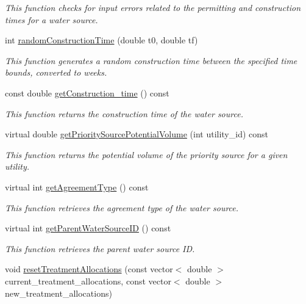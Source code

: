 \begin{DoxyCompactItemize}
\begin{DoxyCompactList}\small\item\em This function checks for input errors related to the permitting and construction times for a water source. \end{DoxyCompactList}\item 
int \mbox{\hyperlink{classWaterSource_aebc6985952d3e69f0d8ae1d0498a1ffe}{random\+Construction\+Time}} (double t0, double tf)
\begin{DoxyCompactList}\small\item\em This function generates a random construction time between the specified time bounds, converted to weeks. \end{DoxyCompactList}\item 
const double \mbox{\hyperlink{classWaterSource_ac1e8880f0aeb56b2728e253d3500ef40}{get\+Construction\+\_\+time}} () const
\begin{DoxyCompactList}\small\item\em This function returns the construction time of the water source. \end{DoxyCompactList}\item 
virtual double \mbox{\hyperlink{classWaterSource_a00a432eba75eaae7195338a8514ac853}{get\+Priority\+Source\+Potential\+Volume}} (int utility\+\_\+id) const
\begin{DoxyCompactList}\small\item\em This function returns the potential volume of the priority source for a given utility. \end{DoxyCompactList}\item 
virtual int \mbox{\hyperlink{classWaterSource_add1082429d114b41cb9e3afaa623aeb1}{get\+Agreement\+Type}} () const
\begin{DoxyCompactList}\small\item\em This function retrieves the agreement type of the water source. \end{DoxyCompactList}\item 
virtual int \mbox{\hyperlink{classWaterSource_a506c77317ae84db0a4d9ea2cd74ddb11}{get\+Parent\+Water\+Source\+ID}} () const
\begin{DoxyCompactList}\small\item\em This function retrieves the parent water source ID. \end{DoxyCompactList}\item 
void \mbox{\hyperlink{classWaterSource_adfc85c196cfc262d4b463e87c459eb3f}{reset\+Treatment\+Allocations}} (const vector$<$ double $>$ current\+\_\+treatment\+\_\+allocations, const vector$<$ double $>$ new\+\_\+treatment\+\_\+allocations)

\end{DoxyCompactItemize}
